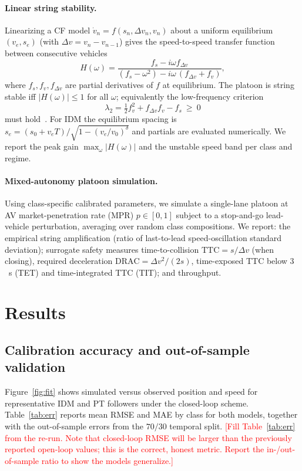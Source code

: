 \documentclass[11pt]{article}
\newcommand{\tbd}[1]{\textcolor{red}{[#1]}}        %
\newcommand{\dv}{\Delta v}
\begin{document}
\paragraph{Linear string stability.} Linearizing a CF model
$\dot v_n=f(s_n,\dv_n,v_n)$ about a uniform equilibrium $(v_e,s_e)$ (with
$\dv=v_n-v_{n-1}$) gives the speed-to-speed transfer function between consecutive
vehicles
\begin{equation}
H(\omega)=\frac{f_s-i\omega f_{\dv}}{(f_s-\omega^2)-i\omega\,(f_{\dv}+f_v)},
\label{eq:H}
\end{equation}
where $f_s,f_v,f_{\dv}$ are partial derivatives of $f$ at equilibrium. The
platoon is string stable iff $|H(\omega)|\le1$ for all $\omega$; equivalently the
low-frequency criterion
\begin{equation}
\lambda_2=\tfrac12 f_v^2+f_{\dv}f_v-f_s\ \ge\ 0
\label{eq:lambda2}
\end{equation}
must hold~\cite{treiber2013}. For IDM the equilibrium spacing is
$s_e=(s_0+v_eT)/\sqrt{1-(v_e/v_0)^\delta}$ and partials are evaluated
numerically. We report the peak gain $\max_\omega|H(\omega)|$ and the unstable
speed band per class and regime.

\paragraph{Mixed-autonomy platoon simulation.} Using class-specific calibrated
parameters, we simulate a single-lane platoon at AV market-penetration rate (MPR)
$p\in[0,1]$ subject to a stop-and-go lead-vehicle perturbation, averaging over
random class compositions. We report: the empirical string amplification (ratio
of last-to-lead speed-oscillation standard deviation); surrogate safety measures
time-to-collision $\mathrm{TTC}=s/\dv$ (when closing), required deceleration
$\mathrm{DRAC}=\dv^2/(2s)$, time-exposed TTC below $3$~s (TET) and time-integrated
TTC (TIT); and throughput.

\section{Results}

\subsection{Calibration accuracy and out-of-sample validation}
Figure~\ref{fig:fit} shows simulated versus observed position and speed for
representative IDM and PT followers under the closed-loop scheme.
Table~\ref{tab:err} reports mean RMSE and MAE by class for both models, together
with the out-of-sample errors from the $70/30$ temporal split. \tbd{Fill
Table~\ref{tab:err} from the re-run. Note that closed-loop RMSE will be larger
than the previously reported open-loop values; this is the correct, honest
metric. Report the in-/out-of-sample ratio to show the models generalize.}
\end{document}

